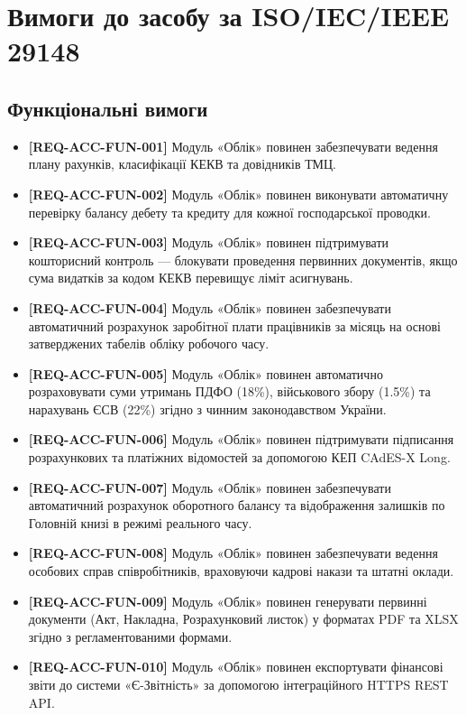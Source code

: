 \documentclass{article}
\begin{document}
\newpage
\section{Вимоги до засобу за ISO/IEC/IEEE 29148}

\subsection{Функціональні вимоги}
\begin{itemize}
    \item \textbf{[REQ-ACC-FUN-001]} Модуль «Облік» повинен забезпечувати ведення плану рахунків, класифікації КЕКВ та довідників ТМЦ.
    \item \textbf{[REQ-ACC-FUN-002]} Модуль «Облік» повинен виконувати автоматичну перевірку балансу дебету та кредиту для кожної господарської проводки.
    \item \textbf{[REQ-ACC-FUN-003]} Модуль «Облік» повинен підтримувати кошторисний контроль --- блокувати проведення первинних документів, якщо сума видатків за кодом КЕКВ перевищує ліміт асигнувань.
    \item \textbf{[REQ-ACC-FUN-004]} Модуль «Облік» повинен забезпечувати автоматичний розрахунок заробітної плати працівників за місяць на основі затверджених табелів обліку робочого часу.
    \item \textbf{[REQ-ACC-FUN-005]} Модуль «Облік» повинен автоматично розраховувати суми утримань ПДФО (18\%), військового збору (1.5\%) та нарахувань ЄСВ (22\%) згідно з чинним законодавством України.
    \item \textbf{[REQ-ACC-FUN-006]} Модуль «Облік» повинен підтримувати підписання розрахункових та платіжних відомостей за допомогою КЕП CAdES-X Long.
    \item \textbf{[REQ-ACC-FUN-007]} Модуль «Облік» повинен забезпечувати автоматичний розрахунок оборотного балансу та відображення залишків по Головній книзі в режимі реального часу.
    \item \textbf{[REQ-ACC-FUN-008]} Модуль «Облік» повинен забезпечувати ведення особових справ співробітників, враховуючи кадрові накази та штатні оклади.
    \item \textbf{[REQ-ACC-FUN-009]} Модуль «Облік» повинен генерувати первинні документи (Акт, Накладна, Розрахунковий листок) у форматах PDF та XLSX згідно з регламентованими формами.
    \item \textbf{[REQ-ACC-FUN-010]} Модуль «Облік» повинен експортувати фінансові звіти до системи «Є-Звітність» за допомогою інтеграційного HTTPS REST API.
\end{itemize}
\end{document}
